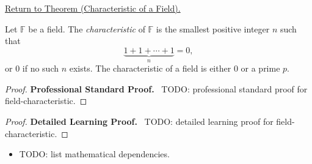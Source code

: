 \newpage
{}
\label{prf:field-characteristic}

\begin{remark*}[Return]
\hyperref[prop:field-characteristic]{Return to Theorem (Characteristic of a Field).}
\end{remark*}

\begin{theorem*}
Let $\mathbb{F}$ be a field. The \emph{characteristic} of $\mathbb{F}$
is the smallest positive integer $n$ such that
\[
\underbrace{1 + 1 + \cdots + 1}_{n} = 0,
\]
or $0$ if no such $n$ exists.
The characteristic of a field is either $0$ or a prime $p$.
\end{theorem*}

\begin{proof}
\textbf{Professional Standard Proof.}~
TODO: professional standard proof for field-characteristic.
\end{proof}

\begin{proof}
\textbf{Detailed Learning Proof.}~
TODO: detailed learning proof for field-characteristic.
\end{proof}

\begin{remark*}
\end{remark*}

\begin{dependencies}
\begin{itemize}
  \item TODO: list mathematical dependencies.
\end{itemize}
\end{dependencies}

\clearpage
